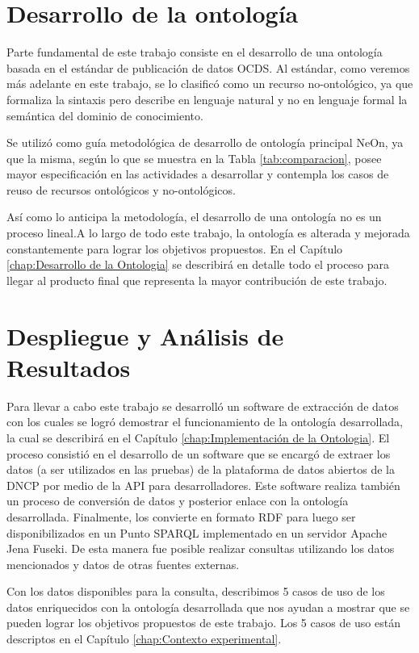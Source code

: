\section{Desarrollo de la ontología}
\label{section:desarrolloOntologia}

Parte fundamental de este trabajo consiste en el desarrollo de una ontología basada en el estándar de publicación de datos OCDS. Al estándar, como veremos más adelante en este trabajo, se lo clasificó como un recurso no-ontológico, ya que formaliza la sintaxis pero describe en lenguaje natural y no en lenguaje formal la semántica del dominio de conocimiento. 

Se utilizó como guía metodológica de desarrollo de ontología principal NeOn, ya que la misma, según lo que se muestra en la Tabla  \ref{tab:comparacion}, posee mayor especificación en las actividades a desarrollar  y contempla los casos de reuso de recursos ontológicos y no-ontológicos. 

Así como lo anticipa la metodología, el desarrollo de una ontología no es un proceso lineal.A lo largo de todo este trabajo, la ontología es alterada y mejorada constantemente para lograr los objetivos propuestos. En el Capítulo \ref{chap:Desarrollo de la Ontologia} se describirá en detalle todo el proceso para llegar al producto final que representa la mayor contribución de este trabajo.

\section{Despliegue y Análisis de Resultados}
\label{section:despliegue}

Para llevar a cabo este trabajo se desarrolló un software de extracción de datos con los cuales se logró demostrar el funcionamiento de la ontología desarrollada, la cual se describirá en el Capítulo \ref{chap:Implementación de la Ontologia}. El proceso consistió en el desarrollo de un software que se encargó de extraer los datos (a ser utilizados en las pruebas) de la plataforma de datos abiertos de la DNCP por medio de la API para desarrolladores. Este software realiza también un proceso de conversión de datos y posterior enlace con la ontología desarrollada. Finalmente, los convierte en formato RDF para luego ser disponibilizados en un Punto SPARQL implementado en un servidor Apache Jena Fuseki. De esta manera fue posible realizar consultas utilizando los datos mencionados y datos de otras fuentes externas.

Con los datos disponibles para la consulta, describimos 5 casos de uso de los datos enriquecidos con la ontología desarrollada que nos ayudan a mostrar que se pueden lograr los objetivos propuestos de este trabajo. Los 5 casos de uso están descriptos en el Capítulo \ref{chap:Contexto experimental}.

